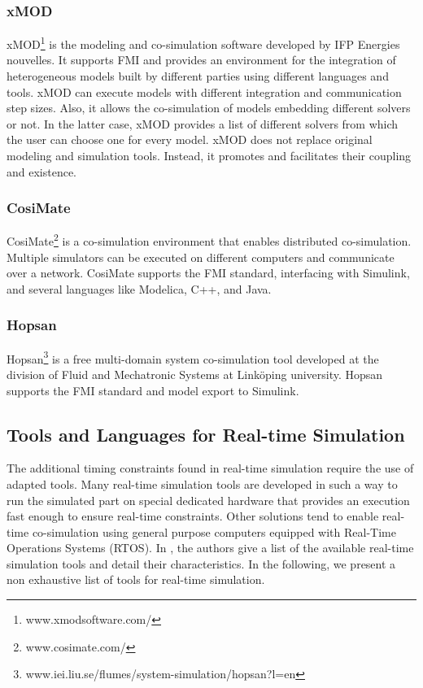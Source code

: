 \subsubsection{xMOD}
xMOD\footnote{www.xmodsoftware.com/} is the modeling and co-simulation software developed by IFP Energies nouvelles. It supports FMI and provides an environment for the integration of heterogeneous models built by different parties using different languages and tools. xMOD can execute models with different integration and communication step sizes. Also, it allows the co-simulation of models embedding different solvers or not. In the latter case, xMOD provides a list of different solvers from which the user can choose one for every model. xMOD does not replace original modeling and simulation tools. Instead, it promotes and facilitates their coupling and existence.

\subsubsection{CosiMate}

CosiMate\footnote{www.cosimate.com/} is a co-simulation environment that enables distributed co-simulation. Multiple simulators can be executed on different computers and communicate over a network. CosiMate supports the FMI standard, interfacing with Simulink, and several languages like Modelica, C++, and Java.

\subsubsection{Hopsan}
Hopsan\footnote{www.iei.liu.se/flumes/system-simulation/hopsan?l=en} is a free multi-domain system co-simulation tool developed at the division of Fluid and Mechatronic Systems at Link\"oping university. Hopsan supports the FMI standard and model export to Simulink.

\subsection{Tools and Languages for Real-time Simulation}

The additional timing constraints found in real-time simulation require the use of adapted tools. Many real-time simulation tools are developed in such a way to run the simulated part on special dedicated hardware that provides an execution fast enough to ensure real-time constraints. Other solutions tend to enable real-time co-simulation using general purpose computers equipped with Real-Time Operations Systems (RTOS). In \cite{faruque:2015}, the authors give a list of the available real-time simulation tools and detail their characteristics. In the following, we present a non exhaustive list of tools for real-time simulation.

